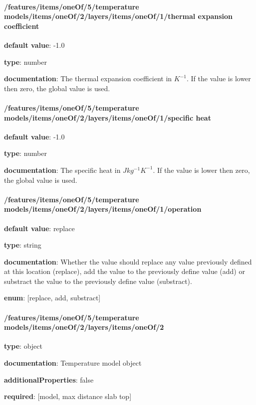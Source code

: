 \begin{itemized}
\end{itemized}\paragraph{/features/items/oneOf/5/temperature models/items/oneOf/2/layers/items/oneOf/1/thermal expansion coefficient} \begin{itemized}
\item {\bf default value}: -1.0
\item {\bf type}: number
\item {\bf documentation}: The thermal expansion coefficient in $K^{-1}$. If the value is lower then zero, the global value is used.
\end{itemized}\paragraph{/features/items/oneOf/5/temperature models/items/oneOf/2/layers/items/oneOf/1/specific heat} \begin{itemized}
\item {\bf default value}: -1.0
\item {\bf type}: number
\item {\bf documentation}: The specific heat in $J kg^{-1} K^{-1}$. If the value is lower then zero, the global value is used.
\end{itemized}\paragraph{/features/items/oneOf/5/temperature models/items/oneOf/2/layers/items/oneOf/1/operation} \begin{itemized}
\item {\bf default value}: replace
\item {\bf type}: string
\item {\bf documentation}: Whether the value should replace any value previously defined at this location (replace), add the value to the previously define value (add) or substract the value to the previously define value (substract).
\item {\bf enum}: [replace, add, substract]\end{itemized}\paragraph{/features/items/oneOf/5/temperature models/items/oneOf/2/layers/items/oneOf/2} \begin{itemized}
\item {\bf type}: object
\item {\bf documentation}: Temperature model object
\item {\bf additionalProperties}: false
\item {\bf required}: [model, max distance slab top]\end{itemized}
